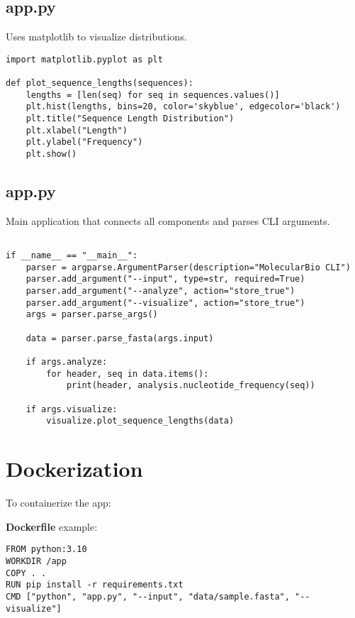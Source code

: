 \documentclass[11pt,a4paper]{article}
\begin{document}
\subsection{app.py}
Uses matplotlib to visualize distributions.

\begin{lstlisting}[style=python, caption={Plotting Sequence Lengths}]
import matplotlib.pyplot as plt

def plot_sequence_lengths(sequences):
    lengths = [len(seq) for seq in sequences.values()]
    plt.hist(lengths, bins=20, color='skyblue', edgecolor='black')
    plt.title("Sequence Length Distribution")
    plt.xlabel("Length")
    plt.ylabel("Frequency")
    plt.show()
\end{lstlisting}

\subsection{app.py}
Main application that connects all components and parses CLI arguments.

\begin{lstlisting}[style=python, caption={Main Entry Point}]

if __name__ == "__main__":
    parser = argparse.ArgumentParser(description="MolecularBio CLI")
    parser.add_argument("--input", type=str, required=True)
    parser.add_argument("--analyze", action="store_true")
    parser.add_argument("--visualize", action="store_true")
    args = parser.parse_args()

    data = parser.parse_fasta(args.input)

    if args.analyze:
        for header, seq in data.items():
            print(header, analysis.nucleotide_frequency(seq))

    if args.visualize:
        visualize.plot_sequence_lengths(data)
\end{lstlisting}

\section{Dockerization}

To containerize the app:

\textbf{Dockerfile} example:
\begin{lstlisting}[style=python, caption={Dockerfile}]
FROM python:3.10
WORKDIR /app
COPY . .
RUN pip install -r requirements.txt
CMD ["python", "app.py", "--input", "data/sample.fasta", "--visualize"]
\end{lstlisting}
\end{document}
